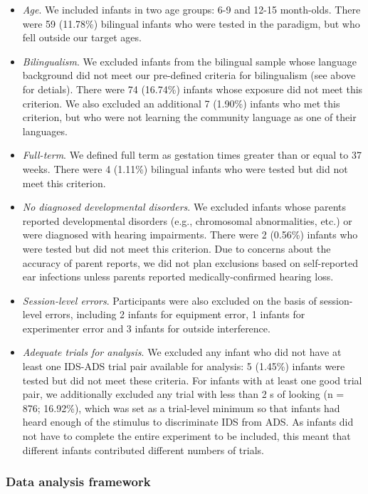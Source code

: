 \documentclass[,man,floatsintext]{apa6}
\begin{document}
\begin{itemize}
\item
  \emph{Age}. We included infants in two age groups: 6-9 and 12-15 month-olds. There were 59 (11.78\%) bilingual infants who were tested in the paradigm, but who fell outside our target ages.
\item
  \emph{Bilingualism}. We excluded infants from the bilingual sample whose language background did not meet our pre-defined criteria for bilingualism (see above for detials). There were 74 (16.74\%) infants whose exposure did not meet this criterion. We also excluded an additional 7 (1.90\%) infants who met this criterion, but who were not learning the community language as one of their languages.
\item
  \emph{Full-term}. We defined full term as gestation times greater than or equal to 37 weeks. There were 4 (1.11\%) bilingual infants who were tested but did not meet this criterion.
\item
  \emph{No diagnosed developmental disorders}. We excluded infants whose parents reported developmental disorders (e.g., chromosomal abnormalities, etc.) or were diagnosed with hearing impairments. There were 2 (0.56\%) infants who were tested but did not meet this criterion. Due to concerns about the accuracy of parent reports, we did not plan exclusions based on self-reported ear infections unless parents reported medically-confirmed hearing loss.
\item
  \emph{Session-level errors}. Participants were also excluded on the basis of session-level errors, including 2 infants for equipment error, 1 infants for experimenter error and 3 infants for outside interference.
\item
  \emph{Adequate trials for analysis}. We excluded any infant who did not have at least one IDS-ADS trial pair available for analysis: 5 (1.45\%) infants were tested but did not meet these criteria. For infants with at least one good trial pair, we additionally excluded any trial with less than 2 s of looking (n = 876; 16.92\%), which was set as a trial-level minimum so that infants had heard enough of the stimulus to discriminate IDS from ADS. As infants did not have to complete the entire experiment to be included, this meant that different infants contributed different numbers of trials.
\end{itemize}

\hypertarget{data-analysis-framework}{%
\subsubsection{Data analysis framework}\label{data-analysis-framework}}
\end{document}
